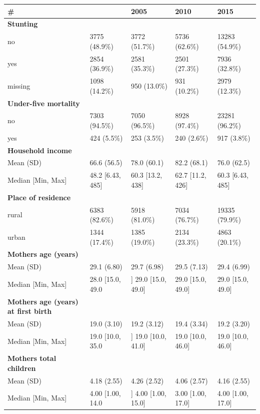 \documentclass[a4paper, 11pt]{article} %
\begin{document}
\begin{table}[]
  \begin{tabular}{lllll}
  \hline
  \# &  & \textbf{2005} & \textbf{2010} & \textbf{2015} \\ \hline
\textbf{Stunting} & & & &  \\		
no	& 3775 (48.9\%) &	3772 (51.7\%) &	5736 (62.6\%) &	13283 (54.9\%) \\
yes	& 2854 (36.9\%) &	2581 (35.3\%) &	2501 (27.3\%) &	7936 (32.8\%) \\
missing &	1098 (14.2\%) &	950 (13.0\%) &	931 (10.2\%) &	2979 (12.3\%) \\ \hline
\textbf{Under-five mortality} & & & &  \\
no	& 7303 (94.5\%) &	7050 (96.5\%) &	8928 (97.4\%) &	23281 (96.2\%) \\
yes	& 424 (5.5\%) &	253 (3.5\%) &	240 (2.6\%) &	917 (3.8\%) \\ \hline
\textbf{Household income} & & & &  \\						
Mean (SD) &	66.6 (56.5) &	78.0 (60.1) &	82.2 (68.1) &	76.0 (62.5) \\
Median [Min, Max] &	48.2 [6.43, 485] & 60.3 [13.2, 438] & 62.7 [11.2, 426] & 60.3 [6.43, 485] \\ \hline
\textbf{Place of residence} & & & &  \\						
rural &	6383 (82.6\%) &	5918 (81.0\%) &	7034 (76.7\%) &	19335 (79.9\%) \\
urban &	1344 (17.4\%) &	1385 (19.0\%) &	2134 (23.3\%) &	4863 (20.1\%) \\ \hline
\textbf{Mothers age (years)} & & & &  \\						
Mean (SD) &	29.1 (6.80) &	29.7 (6.98) &	29.5 (7.13) & 29.4 (6.99) \\
Median [Min, Max] &	28.0 [15.0, 49.0 &]	29.0 [15.0, 49.0] &	29.0 [15.0, 49.0] &	29.0 [15.0, 49.0] \\ \hline
\textbf{Mothers age (years) at first birth} & & & &  \\						
Mean (SD) &	19.0 (3.10) &	19.2 (3.12) &	19.4 (3.34) & 19.2 (3.20) \\
Median [Min, Max] &	19.0 [10.0, 35.0 &]	19.0 [10.0, 41.0] &	19.0 [10.0, 46.0] &	19.0 [10.0, 46.0] \\ \hline
\textbf{Mothers total children} & & & &  \\						
Mean (SD) &	4.18 (2.55) &	4.26 (2.52) &	4.06 (2.57) & 4.16 (2.55) \\
Median [Min, Max] &	4.00 [1.00, 14.0 &]	4.00 [1.00, 15.0] &	3.00 [1.00, 17.0] &	4.00 [1.00, 17.0] \\ \hline

\end{tabular}
\end{table}
\end{document}
